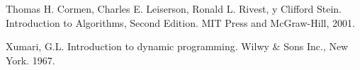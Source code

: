 \begin{thebibliography}{9}

\bibitem {} Thomas H. Cormen, Charles E. Leiserson, Ronald L. Rivest, y Clifford Stein. Introduction to Algorithms, Second Edition. MIT Press and McGraw-Hill, 2001.

\bibitem {} Xumari, G.L. Introduction to dynamic programming. Wilwy $\&$ Sons Inc., New York. 1967.

\end{thebibliography}